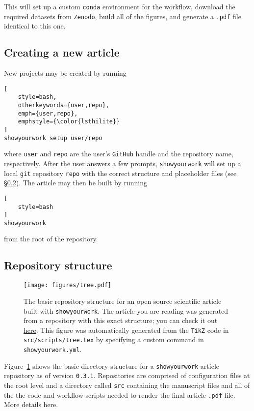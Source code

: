 \documentclass[modern]{aastex631}
\newcommand\VERSION{0.3.1}
\newcommand\xxx[1]{{\color{red}#1}}
\newcommand\syw{\texttt{showyourwork}\xspace}
\newcommand\repourl{https://github.com/showyourwork/showyourwork-paper}
\newcommand\commiturl{\repourl/tree/\GitHubSHA}
\begin{document}
\noindent This will set up a custom \texttt{conda} environment for the workflow, download the required datasets from \texttt{Zenodo}, build all of the figures, and generate a \texttt{.pdf} file identical to this one.

\subsection{Creating a new article}
\label{sec:usage:new}
New projects may be created by running\\

\noindent\begin{minipage}{\linewidth}
\begin{lstlisting}[
    style=bash,
    otherkeywords={user,repo},
    emph={user,repo},
    emphstyle={\color{lsthilite}}
]
showyourwork setup user/repo
\end{lstlisting}
\end{minipage}

\noindent where \texttt{\color{lsthilite}user} and \texttt{\color{lsthilite}repo} are the user's \texttt{GitHub} handle and the repository name, respectively. 
After the user answers a few prompts, \syw will set up a local \texttt{git} repository \texttt{\color{lsthilite}repo} with the correct structure and placeholder files (see \S\ref{sec:usage:struct}).
The article may then be built by running\\

\noindent\begin{minipage}{\linewidth}
\begin{lstlisting}[
    style=bash
]
showyourwork
\end{lstlisting}
\end{minipage}

\noindent from the root of the repository.

\subsection{Repository structure}
\label{sec:usage:struct}
%
\begin{figure}[p!]
    \begin{centering}
        \texttt{[image: figures/tree.pdf]}
        \caption{
            The basic repository structure for an open source scientific article built with \syw.
            The article you are reading was generated from a repository with this exact structure; you can check it out \href{\commiturl}{here}.
            This figure was automatically generated from the \texttt{TikZ} code in \texttt{src/scripts/tree.tex} by specifying a custom command in \texttt{showyourwork.yml}.
        }
        \label{fig:tree}
    \end{centering}
\end{figure}
%
Figure~\ref{fig:tree} shows the basic directory structure for a \syw article repository as of version \texttt{\VERSION}.
Repositories are comprised of configuration files at the root level and a directory called \texttt{src} containing the manuscript files and all of the the code and workflow scripts needed to render the final article \texttt{.pdf} file.
%
\xxx{More details here.}
\end{document}
